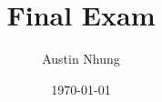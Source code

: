 \documentclass[letterpaper, twocolumn]{article}
\begin{document}
\title{Final Exam}
\author{Austin Nhung}
\date{\today}
\maketitle
\end{document}
